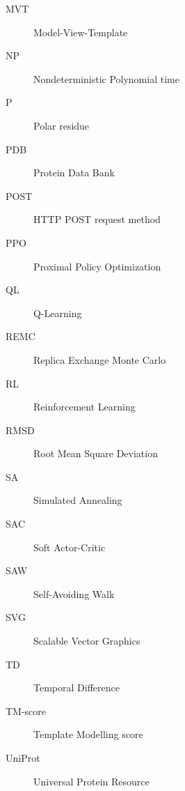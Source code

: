 \begin{description}
    \item[MVT] Model-View-Template
    \item[NP] Nondeterministic Polynomial time
    \item[P] Polar residue
    \item[PDB] Protein Data Bank
    \item[POST] HTTP POST request method
    \item[PPO] Proximal Policy Optimization
    \item[QL] Q-Learning
    \item[REMC] Replica Exchange Monte Carlo
    \item[RL] Reinforcement Learning
    \item[RMSD] Root Mean Square Deviation
    \item[SA] Simulated Annealing
    \item[SAC] Soft Actor-Critic
    \item[SAW] Self-Avoiding Walk
    \item[SVG] Scalable Vector Graphics
    \item[TD] Temporal Difference
    \item[TM-score] Template Modelling score
    \item[UniProt] Universal Protein Resource
\end{description}
